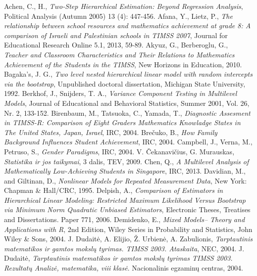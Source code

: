 \documentclass[12pt,a4paper]{article}
\begin{document}
\newpage
\renewcommand\refname{LITERATŪRA IR ŠALTINIAI}
\begin{thebibliography}{1}
 Achen, C., H., \textit{Two-Step Hierarchical Estimation: Beyond Regression Analysis},  Political Analysis (Autumn 2005) 13 (4): 447-456.
 Afana, Y., Lietz, P., \textit{The relationship between school resources and mathematics achievement at grade 8: A comparison of Israeli and Palestinian schools in TIMSS 2007}, Journal for Educational Research Online 5.1, 2013, 59-89.
 Akyuz, G., Berberoglu, G., \textit{Teacher and Classroom Characteristics and Their Relations to Mathematics Achievement of the Students in the TIMSS}, New Horizons in Education, 2010.
 Bagaka's, J. G., \textit{Two level nested hierarchical linear model with random intercepts via the bootstrap}, Unpublished doctoral dissertation, Michigan State University, 1992.
 Berkhof, J., Snijders, T. A., \textit{Variance Component Testing in Multilevel Models}, Journal of Educational and Behavioral Statistics, Summer 2001, Vol. 26, Nr. 2, 133-152.
 Birenbaum, M., Tatsuoka, C., Yamada, T., \textit{Diagnostic Assesment in TIMSS-R: Comparison of Eight Graders Mathematics Knowladge States in The United States, Japan, Israel}, IRC, 2004.
 Brečuko, B., \textit{How Family Background Influences Student Achievement}, IRC, 2004.
 Campbell, J., Verna, M., Petruso, S., \textit{Gender Paradigms}, IRC, 2004.
 V. Čekanavičius, G. Murauskas, \textit{Statistika ir jos taikymai}, 3 dalis, TEV, 2009.
 Chen, Q., \textit{A Multilevel Analysis of Mathematically Low-Achieving Students in Singapore}, IRC, 2013.
 Davidian, M., and Giltinan, D., \textit{Nonlinear Models for Repeated Measurement Data}, New York: Chapman \& Hall/CRC, 1995.
 Delpish, A., \textit{Comparison of Estimators in Hierarchical Linear Modeling: Restricted Maximum Likelihood Versus Bootstrap via Minimum Norm Quadratic Unbiased Estimators}, Electronic Theses, Treatises and Dissertations. Paper 771, 2006.
 Demidenko, E., \textit{Mixed Models– Theory and Applications with R}, 2nd Edition, Wiley Series in Probability and Statistics, John Wiley \& Sons, 2004.
 J. Dudaitė, A. Elijio, Ž. Urbienė, A. Zabulionis, \textit{Tarptautinis matematikos ir gamtos mokslų tyrimas. TIMSS 2003. Ataskaita}, NEC, 2004.
 J. Dudaitė, \textit{Tarptautinis matematikos ir gamtos mokslų tyrimas TIMSS 2003. Rezultatų Analizė, matematika, viii klasė}. Nacionalinis egzaminų centras, 2004.

\end{thebibliography}
\end{document}
